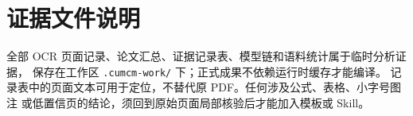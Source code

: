 \section{证据文件说明}

全部 OCR 页面记录、论文汇总、证据记录表、模型链和语料统计属于临时分析证据，
保存在工作区 \texttt{.cumcm-work/} 下；正式成果不依赖运行时缓存才能编译。
记录表中的页面文本可用于定位，不替代原 PDF。任何涉及公式、表格、小字号图注
或低置信页的结论，须回到原始页面局部核验后才能加入模板或 Skill。


